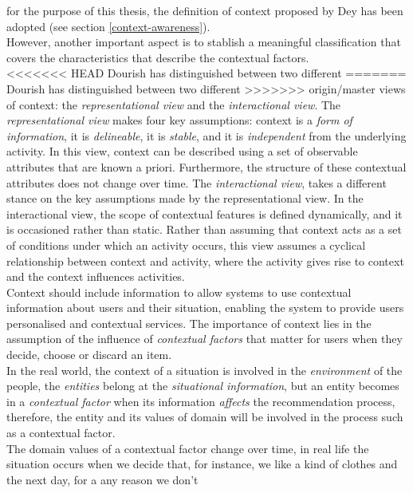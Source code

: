 for the purpose of this thesis, the definition of context
proposed by Dey  \cite{dey2001understanding} has been adopted (see section 
 \ref{context-awareness}). \\However, another important aspect 
is to stablish a meaningful classification that covers the 
characteristics that describe the contextual factors.\\
<<<<<<< HEAD
Dourish \cite{dourish2004we} has distinguished between two different
=======
Dourish\cite{dourish2004we} has distinguished between two different
>>>>>>> origin/master
views of context: the \textit{representational view} and the
\textit{interactional view}. The \textit{representational view} makes
four key assumptions: context is a \textit{form of information}, it is
\textit{delineable}, it is \textit{stable}, and it is
\textit{independent} from the underlying activity. In this view,
context can be described using a set of observable attributes that are
known a priori. Furthermore, the structure of these contextual
attributes does not change over time. The \textit{interactional view},
takes a different stance on the key assumptions made by the
representational view. In the interactional view, the scope of
contextual features is defined dynamically, and it is occasioned
rather than static. Rather than assuming that context acts as a set of
conditions under which an activity occurs, this view assumes a
cyclical relationship between context and activity, where the activity
gives rise to context and the context influences activities.\\
Context should include information to allow systems to use contextual
information about users and their situation, enabling the system 
to provide users personalised and contextual services. The importance of
context lies in the  assumption of the influence of \textit{contextual
factors} that matter for users when they decide, choose or discard an
item.\\
In the real world, the context of a situation is involved in the
\textit{environment} of the people, the \textit{entities} belong at
the \textit{situational information}, but an entity becomes in a
\textit{contextual factor} when its information \textit{affects} the
recommendation process, therefore, the entity and its values of 
domain will be involved in the process such as a contextual factor.\\
The domain values of a contextual factor change over time, in
real life the situation occurs when we decide that, for instance,
we like a kind of clothes and the next day, for a any reason we don't
